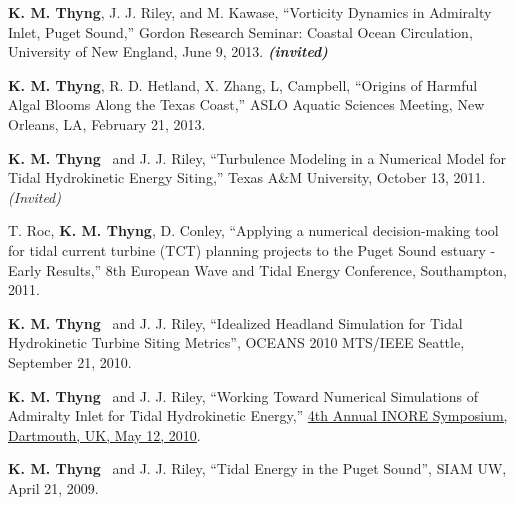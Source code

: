 \documentclass[10pt,letterpaper]{article}
\newcommand{\kmt}{\textbf{K. M. Thyng}}
\newcommand{\inv}{\textbf{\textit{(invited)}}}
\renewenvironment{itemize}{
  \begin{list}{}{
    \setlength{\leftmargin}{1.5em}
    \setlength{\itemsep}{0.25em}
    \setlength{\parskip}{0pt}
    \setlength{\parsep}{0.25em}
  }
}{
  \end{list}
}
\begin{document}
\begin{itemize}
\item \kmt, J. J. Riley, and M. Kawase, ``Vorticity Dynamics in Admiralty Inlet, Puget Sound,'' Gordon Research Seminar: Coastal Ocean Circulation, University of New England, June 9, 2013. \inv

\item \kmt, R. D. Hetland, X. Zhang, L, Campbell, ``Origins of Harmful Algal Blooms Along the Texas Coast,'' ASLO Aquatic Sciences Meeting, New Orleans, LA, February 21, 2013.

\item \kmt~ and J. J. Riley, ``Turbulence Modeling in a Numerical Model for Tidal Hydrokinetic Energy Siting,'' Texas A\&M University, October 13, 2011. \textit{(Invited)}

\item T. Roc, \kmt, D. Conley, ``Applying a numerical decision-making tool for tidal current turbine (TCT) planning projects to the Puget Sound estuary - Early Results,'' 8th European Wave and Tidal Energy Conference, Southampton, 2011.





\item \kmt~ and J. J. Riley, ``Idealized Headland Simulation for Tidal Hydrokinetic Turbine Siting Metrics'', OCEANS 2010 MTS/IEEE Seattle, September 21, 2010.

\item \kmt~ and J. J. Riley, ``Working Toward Numerical Simulations of Admiralty Inlet for Tidal Hydrokinetic Energy,'' \href{http://inore.org/}{4th Annual INORE Symposium, Dartmouth, UK, May 12, 2010}.

\item \kmt~ and J. J. Riley, ``Tidal Energy in the Puget Sound'', SIAM UW, April 21, 2009.


\end{itemize}
\end{document}
